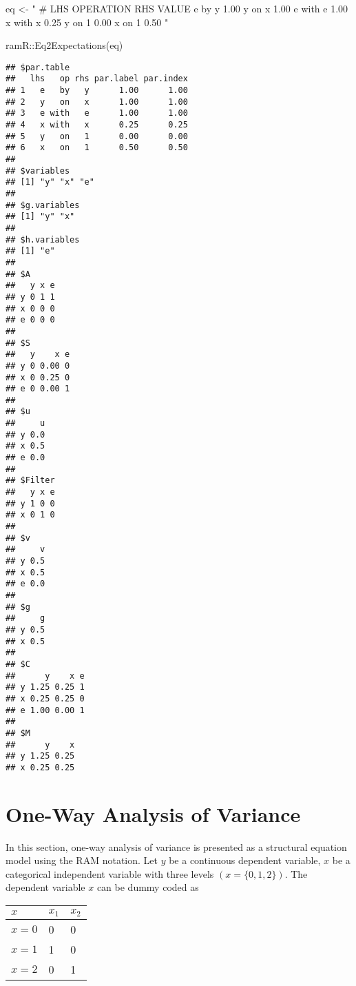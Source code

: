 \documentclass[
]{book}
\newenvironment{Shaded}{\begin{snugshade}}{\end{snugshade}}
\newcommand{\FunctionTok}[1]{\textcolor[rgb]{0.00,0.00,0.00}{#1}}
\newcommand{\NormalTok}[1]{#1}
\newcommand{\OtherTok}[1]{\textcolor[rgb]{0.56,0.35,0.01}{#1}}
\newcommand{\SpecialCharTok}[1]{\textcolor[rgb]{0.00,0.00,0.00}{#1}}
\newcommand{\StringTok}[1]{\textcolor[rgb]{0.31,0.60,0.02}{#1}}
\theoremstyle{definition}
\theoremstyle{definition}
\theoremstyle{definition}
\theoremstyle{remark}
\begin{document}
\begin{Shaded}
\begin{Highlighting}[]
\NormalTok{eq }\OtherTok{\textless{}{-}} \StringTok{"}
\StringTok{  \# LHS OPERATION RHS VALUE}
\StringTok{  e     by        y   1.00}
\StringTok{  y     on        x   1.00}
\StringTok{  e     with      e   1.00}
\StringTok{  x     with      x   0.25}
\StringTok{  y     on        1   0.00}
\StringTok{  x     on        1   0.50}
\StringTok{"}
\end{Highlighting}
\end{Shaded}

\begin{Shaded}
\begin{Highlighting}[]
\NormalTok{ramR}\SpecialCharTok{::}\FunctionTok{Eq2Expectations}\NormalTok{(eq)}
\end{Highlighting}
\end{Shaded}

\begin{verbatim}
## $par.table
##   lhs   op rhs par.label par.index
## 1   e   by   y      1.00      1.00
## 2   y   on   x      1.00      1.00
## 3   e with   e      1.00      1.00
## 4   x with   x      0.25      0.25
## 5   y   on   1      0.00      0.00
## 6   x   on   1      0.50      0.50
## 
## $variables
## [1] "y" "x" "e"
## 
## $g.variables
## [1] "y" "x"
## 
## $h.variables
## [1] "e"
## 
## $A
##   y x e
## y 0 1 1
## x 0 0 0
## e 0 0 0
## 
## $S
##   y    x e
## y 0 0.00 0
## x 0 0.25 0
## e 0 0.00 1
## 
## $u
##     u
## y 0.0
## x 0.5
## e 0.0
## 
## $Filter
##   y x e
## y 1 0 0
## x 0 1 0
## 
## $v
##     v
## y 0.5
## x 0.5
## e 0.0
## 
## $g
##     g
## y 0.5
## x 0.5
## 
## $C
##      y    x e
## y 1.25 0.25 1
## x 0.25 0.25 0
## e 1.00 0.00 1
## 
## $M
##      y    x
## y 1.25 0.25
## x 0.25 0.25
\end{verbatim}

\hypertarget{ram-anova}{%
\chapter{One-Way Analysis of Variance}\label{ram-anova}}

In this section,
one-way analysis of variance is presented as a structural equation model
using the RAM notation.
Let \(y\) be a continuous dependent variable,
\(x\) be a categorical independent variable
with three levels
\(\left( x = \{0, 1, 2\} \right)\).
The dependent variable \(x\) can be dummy coded as

\begin{tabular}{l|l|l}
\hline
$x$ & $x_1$ & $x_2$\\
\hline
$x = 0$ & 0 & 0\\
\hline
$x = 1$ & 1 & 0\\
\hline
$x = 2$ & 0 & 1\\
\hline
\end{tabular}
\end{document}
